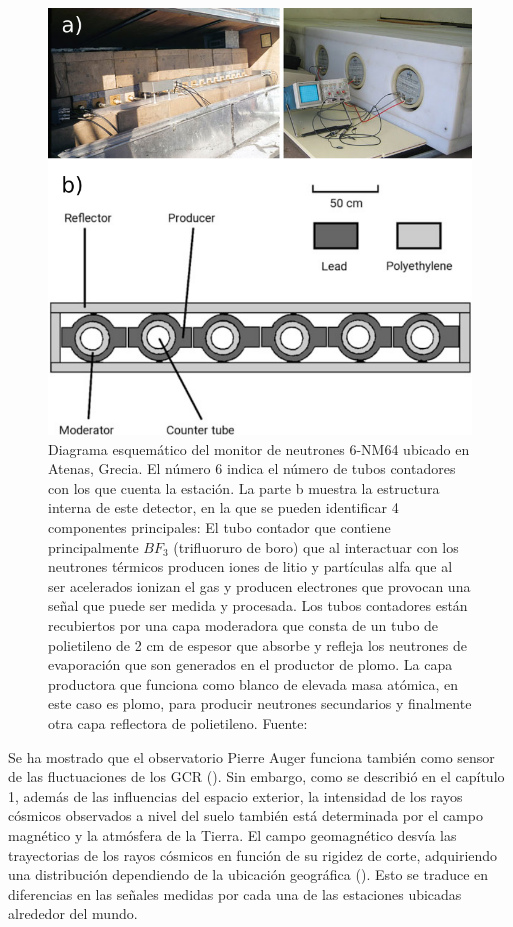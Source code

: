 \begin{figure}
\centering
    \includegraphics[width=0.5\linewidth]{Figs/NM_schem.png}
    \caption[Diagrama esquemático del monitor de neutrones 6-NM64 ubicado en Atenas, Grecia.]{Diagrama esquemático del monitor de neutrones 6-NM64 ubicado en Atenas, Grecia. El número 6 indica el número de tubos contadores con los que cuenta la estación. La parte b muestra la estructura interna de este detector, en la que se pueden identificar 4 componentes principales: El tubo contador que contiene principalmente $BF_{3}$ (trifluoruro de boro) que al interactuar con los neutrones térmicos producen iones de litio y partículas alfa que al ser acelerados ionizan el gas y producen electrones que provocan una señal que puede ser medida y procesada. Los tubos contadores están recubiertos por una capa moderadora que consta de un tubo de polietileno de 2 cm de espesor que absorbe y refleja los neutrones de evaporación que son generados en el productor de plomo. La capa productora que funciona como blanco de elevada masa atómica, en este caso es plomo, para producir neutrones secundarios y finalmente otra capa reflectora de polietileno. Fuente: \cite{OlgaMalandraki_2018}}
    \label{fig:NM_schem}
\end{figure}
Se ha mostrado que el observatorio Pierre Auger funciona también como sensor de las fluctuaciones de los GCR (\cite{martin_ICRC}). Sin embargo, como se describió en el capítulo 1, además de las influencias del espacio exterior, la intensidad de los rayos cósmicos observados a nivel del suelo también está determinada por el campo magnético y la atmósfera de la Tierra.  El campo geomagnético desvía las trayectorias de los rayos cósmicos en función de su rigidez de corte, adquiriendo una distribución dependiendo de la ubicación geográfica (\cite{herbst_2013influence}). Esto se traduce en diferencias en las señales medidas por cada una de las estaciones ubicadas alrededor del mundo. 

